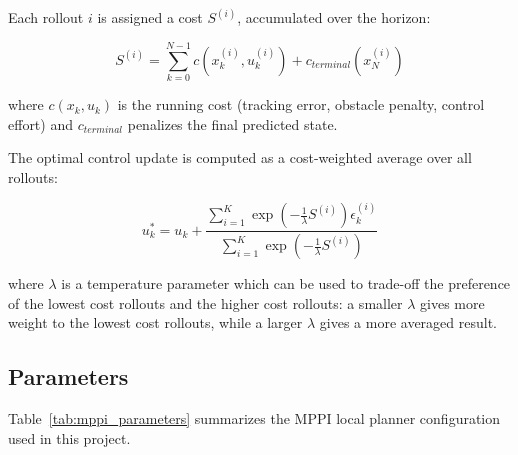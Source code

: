 Each rollout $i$ is assigned a cost $S^{(i)}$, accumulated over the horizon:

\begin{equation}
	S^{(i)} = \sum_{k=0}^{N-1} c(x_k^{(i)}, u_k^{(i)}) + c_{terminal}(x_N^{(i)})
	\label{eq:mppi_cost}
\end{equation}

where $c(x_k, u_k)$ is the running cost (tracking error, obstacle penalty, control effort) and $c_{terminal}$ penalizes the final predicted state.

The optimal control update is computed as a cost-weighted average over all rollouts:

\begin{equation}
	u_k^{*} = u_k + \frac{\sum_{i=1}^{K} \exp\left(-\frac{1}{\lambda} S^{(i)}\right) \epsilon_k^{(i)}}{\sum_{i=1}^{K} \exp\left(-\frac{1}{\lambda} S^{(i)}\right)}
	\label{eq:mppi_update}
\end{equation}

where $\lambda$ is a temperature parameter which can be used to trade-off the preference of the lowest cost rollouts and the higher cost rollouts: a smaller $\lambda$ gives more weight to the lowest cost rollouts, while a larger $\lambda$ gives a more averaged result.
\subsection{Parameters}
\label{subsec:mppi_parameters}
Table~\ref{tab:mppi_parameters} summarizes the MPPI local planner configuration used in this project.

